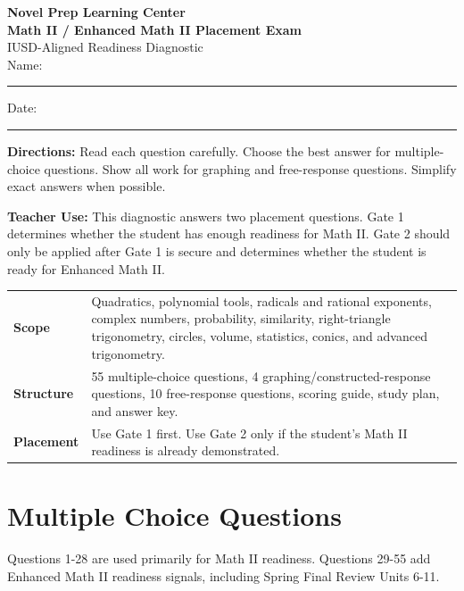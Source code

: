 \documentclass[11pt]{article}
\renewcommand{\arraystretch}{1.18}
\newcommand{\ansline}{\rule{2.5in}{0.4pt}}
\begin{document}
\begin{center}
    {\LARGE \textbf{Novel Prep Learning Center}}\\[0.2em]
    {\Large \textbf{Math II / Enhanced Math II Placement Exam}}\\[0.25em]
    {\large IUSD-Aligned Readiness Diagnostic}\\[0.6em]
    Name:\ \ansline \hfill Date:\ \ansline
\end{center}

\begin{titlebox}
\textbf{Directions:} Read each question carefully. Choose the best answer for multiple-choice questions. Show all work for graphing and free-response questions. Simplify exact answers when possible.
\end{titlebox}

\begin{problemBox}
\textbf{Teacher Use:} This diagnostic answers two placement questions. Gate 1 determines whether the student has enough readiness for Math II. Gate 2 should only be applied after Gate 1 is secure and determines whether the student is ready for Enhanced Math II.
\end{problemBox}

\begin{scoreCard}
\renewcommand{\arraystretch}{1.18}
\begin{tabularx}{\textwidth}{>{\bfseries\color{nppurple2}}L{2.7cm}X}
Scope & Quadratics, polynomial tools, radicals and rational exponents, complex numbers, probability, similarity, right-triangle trigonometry, circles, volume, statistics, conics, and advanced trigonometry.\\
Structure & 55 multiple-choice questions, 4 graphing/constructed-response questions, 10 free-response questions, scoring guide, study plan, and answer key.\\
Placement & Use Gate 1 first. Use Gate 2 only if the student's Math II readiness is already demonstrated.
\end{tabularx}
\end{scoreCard}

\newpage
\section*{Multiple Choice Questions}
\begin{sectionNote}
Questions 1-28 are used primarily for Math II readiness. Questions 29-55 add Enhanced Math II readiness signals, including Spring Final Review Units 6-11.
\end{sectionNote}
\end{document}
